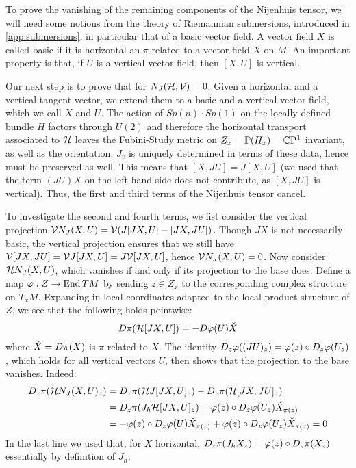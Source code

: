 \begin{myproof}
	To prove the vanishing of the remaining components of the Nijenhuis tensor, we will need some notions from the theory of Riemannian submersions, introduced in \cref{app:submersions}, in particular that of a basic vector field. A vector field $X$ is called basic if it is horizontal an $\pi$-related to a vector field $\check X$ on $M$. An important property is that, if $U$ is a vertical vector field, then $[X,U]$ is vertical.
	
	Our next step is to prove that for $N_J(\mathcal{H},\mathcal{V})=0$. Given a horizontal and a vertical tangent vector, we extend them to a basic and a vertical vector field, which we call $X$ and $U$. The action of $Sp(n)\cdot Sp(1)$ on the locally defined bundle $H$ factors through $U(2)$ and therefore the horizontal transport associated to $\mathcal{H}$ leaves the Fubini-Study metric on $Z_x=\mathbb{P}(H_x)=\mathbb{C}\mathrm{P}^1$ invariant, as well as the orientation. $J_v$ is uniquely determined in terms of these data, hence must be preserved as well. This means that $[X,JU]=J[X,U]$ (we used that the term $(JU)X$ on the left hand side does not contribute, as $[X,JU]$ is vertical).
	Thus, the first and third terms of the Nijenhuis tensor cancel. 
	
	To investigate the second and fourth terms, we fist consider the vertical projection $\mathcal{V} N_J(X,U)=\mathcal{V}(J[JX,U]-[JX,JU])$. Though $JX$ is not necessarily basic, the vertical projection ensures that we still have $\mathcal{V}[JX,JU]=\mathcal{V}J[JX,U]=J\mathcal{V}[JX,U]$, hence $\mathcal{V} N_J(X,U)=0$. Now consider $\mathcal{H} N_J(X,U)$, which vanishes if and only if its projection to the base does. Define a map $\varphi:Z\to \operatorname{End} TM$ by sending $z\in Z_x$ to the corresponding complex structure on $T_xM$. Expanding in local coordinates adapted to the local product structure of $Z$, we see that the following holds pointwise:
	\begin{equation*}
		D \pi(\mathcal{H}[J X,U])=-D \varphi(U)\check X
	\end{equation*}
	where $\check X=D \pi(X)$ is $\pi$-related to $X$. The identity $D_z\varphi((JU)_z)=\varphi(z)\circ D_z \varphi(U_z)$,
	which holds for all vertical vectors $U$, then shows that the projection to the base vanishes. Indeed:
	\begin{align*}
		D_z\pi(\mathcal{H} N_J(X,U)_z)
		&=D_z\pi (\mathcal{H}J[JX,U]_z)-D_z\pi (\mathcal{H}[JX,JU]_z)\\
		&=D_z\pi (J_h\mathcal{H}[JX,U]_z)
		+\varphi(z)\circ D_z\varphi(U_z) \check X_{\pi(z)}\\
		&=-\varphi(z)\circ D_z \varphi(U)\check X_{\pi(z)}
		+\varphi(z)\circ D_z\varphi(U_z) \check X_{\pi(z)}=0
	\end{align*}
	In the last line we used that, for $X$ horizontal, $D_z \pi(J_h X_z)=\varphi(z)\circ D_z \pi(X_z)$ essentially by definition of $J_h$.
	

\end{myproof}
